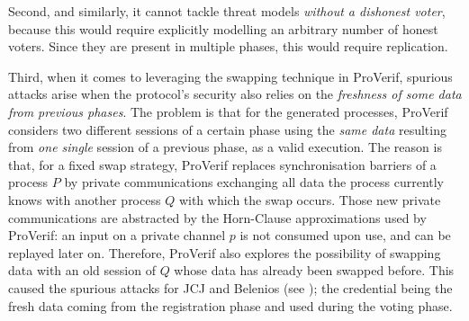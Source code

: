       
	Second, and similarly, it cannot tackle threat models
	{\em without a
    dishonest voter}, because this would require explicitly modelling an arbitrary number of honest
    voters. Since they are
    present in multiple phases, this would require replication.
      
      Third, when it comes to leveraging the swapping technique in ProVerif,
      spurious attacks arise
      when the protocol's security also relies on the {\em freshness of some data from previous phases}.
      The problem is that for the
      generated processes,
      ProVerif considers two different sessions of a certain phase
      using the {\em same data} resulting from {\em one single} session of a
      previous phase, as a valid execution.
      The reason is that, for a fixed swap strategy, 
      ProVerif replaces synchronisation barriers of a process $P$
      by private communications exchanging all data the process
      currently knows
      with another process $Q$ with which the swap occurs.
%
      Those new private communications are abstracted by the
      Horn-Clause approximations used by ProVerif:
      an input on a private channel $p$ is not consumed upon use, and can be replayed later on.
      Therefore, %
      ProVerif also explores the possibility of swapping data with an
      old session of $Q$ whose data has already been swapped before.
      This caused the spurious attacks for JCJ and Belenios (see ); the credential being the fresh data coming
      from the registration phase and used during the voting phase.

      
